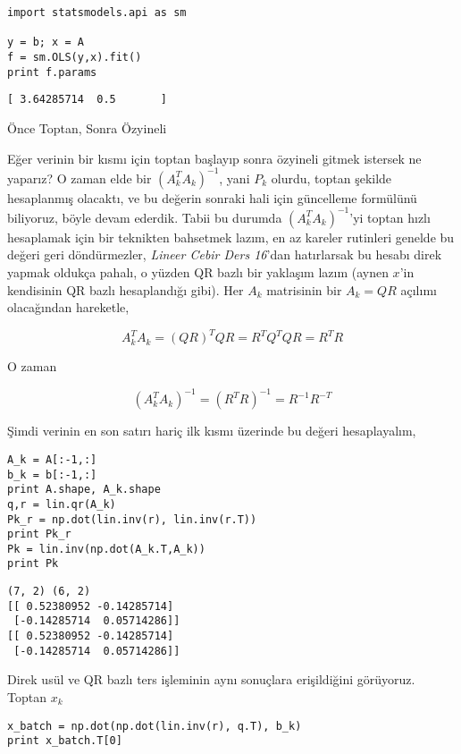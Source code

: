 \documentclass[12pt,fleqn]{article}\usepackage{../../common}
\begin{document}
\begin{verbatim}
import statsmodels.api as sm

y = b; x = A
f = sm.OLS(y,x).fit()
print f.params
\end{verbatim}

\begin{verbatim}
[ 3.64285714  0.5       ]
\end{verbatim}

Önce Toptan, Sonra Özyineli

Eğer verinin bir kısmı için toptan başlayıp sonra özyineli gitmek istersek
ne yaparız? O zaman elde bir $(A_k^TA_k)^{-1}$, yani $P_{k}$ olurdu, toptan
şekilde hesaplanmış olacaktı, ve bu değerin sonraki hali için güncelleme
formülünü biliyoruz, böyle devam ederdik. Tabii bu durumda
$(A_k^TA_k)^{-1}$'yi toptan hızlı hesaplamak için bir teknikten bahsetmek
lazım, en az kareler rutinleri genelde bu değeri geri döndürmezler, {\em
  Lineer Cebir Ders 16}'dan hatırlarsak bu hesabı direk yapmak oldukça
pahalı, o yüzden QR bazlı bir yaklaşım lazım (aynen $x$'in kendisinin QR
bazlı hesaplandığı gibi). Her $A_k$ matrisinin bir $A_k = QR$ açılımı
olacağından hareketle, 

$$ A_k^TA_k = (QR)^TQR = R^TQ^TQR = R^TR $$

O zaman 

$$ (A_k^TA_k)^{-1} = (R^TR)^{-1} = R^{-1}R^{-T} $$

Şimdi verinin en son satırı hariç ilk kısmı üzerinde bu değeri hesaplayalım,

\begin{verbatim}
A_k = A[:-1,:]
b_k = b[:-1,:]
print A.shape, A_k.shape
q,r = lin.qr(A_k)
Pk_r = np.dot(lin.inv(r), lin.inv(r.T))
print Pk_r
Pk = lin.inv(np.dot(A_k.T,A_k))
print Pk
\end{verbatim}

\begin{verbatim}
(7, 2) (6, 2)
[[ 0.52380952 -0.14285714]
 [-0.14285714  0.05714286]]
[[ 0.52380952 -0.14285714]
 [-0.14285714  0.05714286]]
\end{verbatim}

Direk usül ve QR bazlı ters işleminin aynı sonuçlara erişildiğini
görüyoruz. Toptan $x_k$

\begin{verbatim}
x_batch = np.dot(np.dot(lin.inv(r), q.T), b_k)
print x_batch.T[0]
\end{verbatim}
\end{document}
